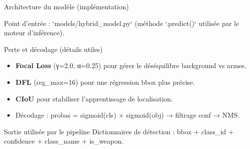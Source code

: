 \documentclass[aspectratio=169,11pt]{beamer}
\begin{document}
\begin{frame}{Architecture du modèle (implémentation)}
  \begin{center}
  \end{center}

  \vspace{0.2cm}
  \footnotesize\textcolor{brandGray}{Point d'entrée : `models/hybrid_model.py` (méthode `.predict()` utilisée par le moteur d'inférence).}
\end{frame}

\begin{frame}{Perte et décodage (détails utiles)}
  \begin{itemize}
    \item \textbf{Focal Loss} (γ=2.0, α=0.25) pour gérer le déséquilibre background vs armes.
    \item \textbf{DFL} (reg\_max=16) pour une régression bbox plus précise.
    \item \textbf{CIoU} pour stabiliser l'apprentissage de localisation.
    \item Décodage : probas = sigmoid(cls) × sigmoid(obj) → filtrage conf → NMS.
  \end{itemize}

  \vspace{0.2cm}
  \begin{block}{Sortie utilisée par le pipeline}
    Dictionnaires de détection : bbox + class\_id + confidence + class\_name + is\_weapon.
  \end{block}
\end{frame}
\end{document}
